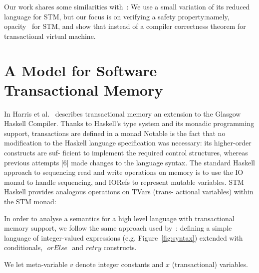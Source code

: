 \documentclass{jfp1}
\newcommand{\Retry}{\textit{retry}}
\newcommand{\OrElse}{\textit{ orElse }}
\begin{document}
Our work shares some similarities with~\cite{Hu09}: We use a small
variation of its reduced language for STM, but our focus is on 
verifying a safety property:namely, opacity~\cite{Guerraoui2008} for STM,
and show that instead of a compiler correctness theorem for transactional virtual 
machine.


\section{A Model for Software Transactional Memory}

In Harris et al.~\cite{Harris05} describes  transactional memory an
extension to the Glasgow Haskell Compiler. 
Thanks to Haskell's type system and its monadic programming support, 
transactions are defined in a monad 
Notable is the fact that no modification to the Haskell language specification was necessary: its higher-order constructs are suf- ficient to implement the required control structures, whereas previous attempts [6] made changes to the language syntax.
The standard Haskell approach to sequencing read and write operations on memory is to use the IO monad to handle sequencing, and IORefs to represent mutable variables. STM Haskell provides analogous operations on TVars (trans- actional variables) within the STM monad:



In order to analyse a semantics for a high level language with
transactional memory support, we follow the same approach used
by~\cite{Hu08}: defining a simple language of integer-valued 
expressions (e.g. Figure~\ref{fig:syntax}) extended with conditionals,
$\OrElse$ and $\Retry$ constructs. 

We let meta-variable $v$ denote integer constants and $x$ 
(transactional) variables. 
\end{document}
